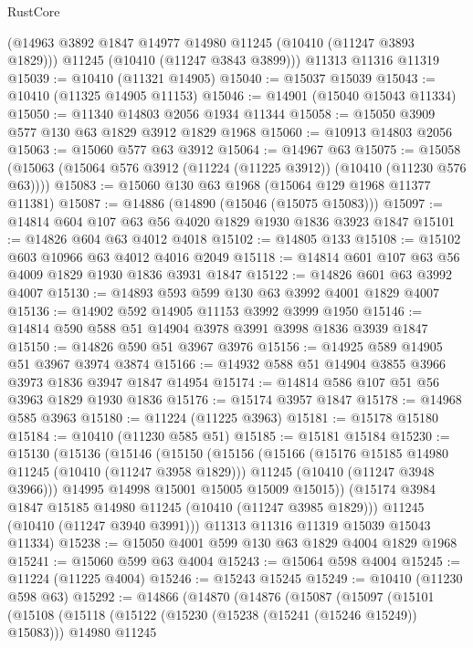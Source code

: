 \begin{lexlean}{RustCore}
\begin{coremodule}
      (@14963 @3892 @1847 @14977 @14980 @11245 (@10410 (@11247 @3893 @1829)))
      @11245
      (@10410 (@11247 @3843 @3899)))
    @11313
    @11316
    @11319
@15039 := @10410 (@11321 @14905)
@15040 := @15037 @15039
@15043 := @10410 (@11325 @14905 @11153)
@15046 := @14901 (@15040 @15043 @11334)
@15050 := @11340 @14803 @2056 @1934 @11344
@15058 := @15050 @3909 @577 @130 @63 @1829 @3912 @1829 @1968
@15060 := @10913 @14803 @2056
@15063 := @15060 @577 @63 @3912
@15064 := @14967 @63
@15075 := @15058 (@15063 (@15064 @576 @3912 (@11224 (@11225 @3912)) (@10410 (@11230 @576 @63))))
@15083 := @15060 @130 @63 @1968 (@15064 @129 @1968 @11377 @11381)
@15087 := @14886 (@14890 (@15046 (@15075 @15083)))
@15097 := @14814 @604 @107 @63 @56 @4020 @1829 @1930 @1836 @3923 @1847
@15101 := @14826 @604 @63 @4012 @4018
@15102 := @14805 @133
@15108 := @15102 @603 @10966 @63 @4012 @4016 @2049
@15118 := @14814 @601 @107 @63 @56 @4009 @1829 @1930 @1836 @3931 @1847
@15122 := @14826 @601 @63 @3992 @4007
@15130 := @14893 @593 @599 @130 @63 @3992 @4001 @1829 @4007
@15136 := @14902 @592 @14905 @11153 @3992 @3999 @1950
@15146 := @14814 @590 @588 @51 @14904 @3978 @3991 @3998 @1836 @3939 @1847
@15150 := @14826 @590 @51 @3967 @3976
@15156 := @14925 @589 @14905 @51 @3967 @3974 @3874
@15166 := @14932 @588 @51 @14904 @3855 @3966 @3973 @1836 @3947 @1847 @14954
@15174 := @14814 @586 @107 @51 @56 @3963 @1829 @1930 @1836
@15176 := @15174 @3957 @1847
@15178 := @14968 @585 @3963
@15180 := @11224 (@11225 @3963)
@15181 := @15178 @15180
@15184 := @10410 (@11230 @585 @51)
@15185 := @15181 @15184
@15230 := @15130
    (@15136
      (@15146
        (@15150
          (@15156
            (@15166
              (@15176 @15185 @14980 @11245 (@10410 (@11247 @3958 @1829)))
              @11245
              (@10410 (@11247 @3948 @3966)))
            @14995
            @14998
            @15001
            @15005
            @15009
            @15015))
        (@15174 @3984 @1847 @15185 @14980 @11245 (@10410 (@11247 @3985 @1829)))
        @11245
        (@10410 (@11247 @3940 @3991)))
      @11313
      @11316
      @11319
      @15039
      @15043
      @11334)
@15238 := @15050 @4001 @599 @130 @63 @1829 @4004 @1829 @1968
@15241 := @15060 @599 @63 @4004
@15243 := @15064 @598 @4004
@15245 := @11224 (@11225 @4004)
@15246 := @15243 @15245
@15249 := @10410 (@11230 @598 @63)
@15292 := @14866
    (@14870
      (@14876
        (@15087
          (@15097
            (@15101
              (@15108
                (@15118
                  (@15122 (@15230 (@15238 (@15241 (@15246 @15249)) @15083)))
                  @14980
                  @11245

\end{coremodule}
\end{lexlean}
